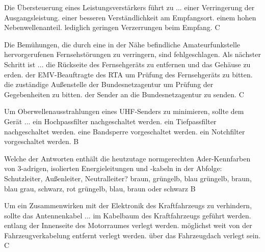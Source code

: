 {Die Übersteuerung eines Leistungsverstärkers führt zu ...}%
{einer Verringerung der Ausgangsleistung.}%
{einer besseren Verständlichkeit am Empfangsort.}%
{einem hohen Nebenwellenanteil.}%
{lediglich geringen Verzerrungen beim Empfang.}%
{C}%

{Die Bemühungen, die durch eine in der Nähe befindliche Amateurfunkstelle hervorgerufenen Fernsehstörungen zu verringern, sind fehlgeschlagen. Als nächster Schritt ist ...}%
{die Rückseite des Fernsehgeräts zu entfernen und das Gehäuse zu erden.}%
{der EMV-Beauftragte des RTA um Prüfung des Fernsehgeräts zu bitten.}%
{die zuständige Außenstelle der Bundesnetzagentur um Prüfung der Gegebenheiten zu bitten.}%
{der Sender an die Bundesnetzagentur zu senden.}%
{C}%

{Um Oberwellenausstrahlungen eines UHF-Senders zu minimieren, sollte dem Gerät ...}%
{ein Hochpassfilter nachgeschaltet werden.}%
{ein Tiefpassfilter nachgeschaltet werden.}%
{eine Bandsperre vorgeschaltet werden.}%
{ein Notchfilter vorgeschaltet werden.}%
{B}%

{Welche der Antworten enthält die heutzutage normgerechten Ader-Kennfarben von 3-adrigen, isolierten Energieleitungen und -kabeln in der Abfolge: Schutzleiter, Außenleiter, Neutralleiter?}%
{braun, grüngelb, blau}%
{grüngelb, braun, blau}%
{grau, schwarz, rot}%
{grüngelb, blau, braun oder schwarz}%
{B}%

{Um ein Zusammenwirken mit der Elektronik des Kraftfahrzeugs zu verhindern, sollte das Antennenkabel ...}%
{im Kabelbaum des Kraftfahrzeugs geführt werden.}%
{entlang der Innenseite des Motorraumes verlegt werden.}%
{möglichst weit von der Fahrzeugverkabelung
entfernt verlegt werden.}%
{über das Fahrzeugdach verlegt sein.}%
{C}%